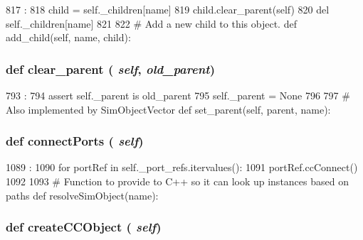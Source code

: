 \begin{DoxyCode}
817                                :
818         child = self._children[name]
819         child.clear_parent(self)
820         del self._children[name]
821 
822     # Add a new child to this object.
    def add_child(self, name, child):
\end{DoxyCode}
\hypertarget{classm5_1_1SimObject_1_1SimObject_a087680f475bb0223aaae928a37e04c3e}{
\subsubsection[{clear\_\-parent}]{\setlength{\rightskip}{0pt plus 5cm}def clear\_\-parent ( {\em self}, \/   {\em old\_\-parent})}}
\label{classm5_1_1SimObject_1_1SimObject_a087680f475bb0223aaae928a37e04c3e}



\begin{DoxyCode}
793                                       :
794         assert self._parent is old_parent
795         self._parent = None
796 
797     # Also implemented by SimObjectVector
    def set_parent(self, parent, name):
\end{DoxyCode}
\hypertarget{classm5_1_1SimObject_1_1SimObject_afeafa3ec2def8e686e57765b6738f805}{
\subsubsection[{connectPorts}]{\setlength{\rightskip}{0pt plus 5cm}def connectPorts ( {\em self})}}
\label{classm5_1_1SimObject_1_1SimObject_afeafa3ec2def8e686e57765b6738f805}



\begin{DoxyCode}
1089                           :
1090         for portRef in self._port_refs.itervalues():
1091             portRef.ccConnect()
1092 
1093 # Function to provide to C++ so it can look up instances based on paths
def resolveSimObject(name):
\end{DoxyCode}
\hypertarget{classm5_1_1SimObject_1_1SimObject_a3fae3679b17100773723868a6b0f9ce0}{
\subsubsection[{createCCObject}]{\setlength{\rightskip}{0pt plus 5cm}def createCCObject ( {\em self})}}
\label{classm5_1_1SimObject_1_1SimObject_a3fae3679b17100773723868a6b0f9ce0}



